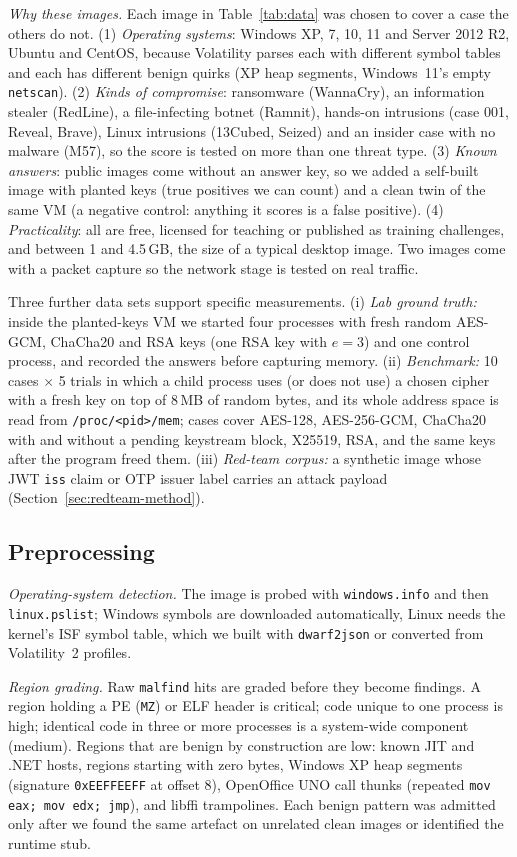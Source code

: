 \textit{Why these images.} Each image in Table~\ref{tab:data} was chosen to cover a case the others do not.
(1) \emph{Operating systems}: Windows XP, 7, 10, 11 and Server 2012 R2, Ubuntu and CentOS, because Volatility
parses each with different symbol tables and each has different benign quirks (XP heap segments, Windows~11's
empty \texttt{netscan}). (2) \emph{Kinds of compromise}: ransomware (WannaCry), an information stealer (RedLine),
a file-infecting botnet (Ramnit), hands-on intrusions (case 001, Reveal, Brave), Linux intrusions (13Cubed, Seized)
and an insider case with no malware (M57), so the score is tested on more than one threat type. (3) \emph{Known
answers}: public images come without an answer key, so we added a self-built image with planted keys (true
positives we can count) and a clean twin of the same VM (a negative control: anything it scores is a false
positive). (4) \emph{Practicality}: all are free, licensed for teaching or published as training challenges,
and between 1 and 4.5\,GB, the size of a typical desktop image. Two images come with a packet capture so the
network stage is tested on real traffic.

Three further data sets support specific measurements. (i) \emph{Lab ground truth:} inside the planted-keys VM
we started four processes with fresh random AES-GCM, ChaCha20 and RSA keys (one RSA key with $e=3$) and one
control process, and recorded the answers before capturing memory. (ii) \emph{Benchmark:} 10 cases
$\times$ 5 trials in which a child process uses (or does not use) a chosen cipher with a fresh key on top of
8\,MB of random bytes, and its whole address space is read from \texttt{/proc/<pid>/mem}; cases cover AES-128,
AES-256-GCM, ChaCha20 with and without a pending keystream block, X25519, RSA, and the same keys after the
program freed them. (iii) \emph{Red-team corpus:} a synthetic image whose JWT \texttt{iss} claim or OTP issuer
label carries an attack payload (Section~\ref{sec:redteam-method}).

\subsection{Preprocessing}
\textit{Operating-system detection.} The image is probed with \texttt{windows.info} and then
\texttt{linux.pslist}; Windows symbols are downloaded automatically, Linux needs the kernel's ISF symbol table,
which we built with \texttt{dwarf2json} or converted from Volatility~2 profiles.

\textit{Region grading.} Raw \texttt{malfind} hits are graded before they become findings. A region holding a PE
(\texttt{MZ}) or ELF header is critical; code unique to one process is high; identical code in three or more
processes is a system-wide component (medium). Regions that are benign by construction are low: known JIT and
.NET hosts, regions starting with zero bytes, Windows XP heap segments (signature \texttt{0xEEFFEEFF} at offset 8),
OpenOffice UNO call thunks (repeated \texttt{mov eax; mov edx; jmp}), and libffi trampolines. Each benign pattern
was admitted only after we found the same artefact on unrelated clean images or identified the runtime stub.

